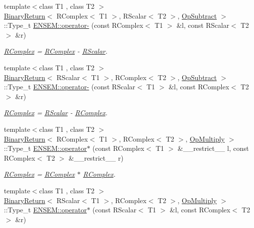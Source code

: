 \begin{DoxyCompactItemize}
{\footnotesize template$<$class T1 , class T2 $>$ }\\\mbox{\hyperlink{structBinaryReturn}{Binary\+Return}}$<$ R\+Complex$<$ T1 $>$, R\+Scalar$<$ T2 $>$, \mbox{\hyperlink{structOpSubtract}{Op\+Subtract}} $>$\+::Type\+\_\+t \mbox{\hyperlink{group__rcomplex_ga9ea00fde5e26657fc53ca42c40fa6618}{E\+N\+S\+E\+M\+::operator-\/}} (const R\+Complex$<$ T1 $>$ \&l, const R\+Scalar$<$ T2 $>$ \&r)
\begin{DoxyCompactList}\small\item\em \mbox{\hyperlink{classENSEM_1_1RComplex}{R\+Complex}} = \mbox{\hyperlink{classENSEM_1_1RComplex}{R\+Complex}} -\/ \mbox{\hyperlink{classENSEM_1_1RScalar}{R\+Scalar}}. \end{DoxyCompactList}\item 
{\footnotesize template$<$class T1 , class T2 $>$ }\\\mbox{\hyperlink{structBinaryReturn}{Binary\+Return}}$<$ R\+Scalar$<$ T1 $>$, R\+Complex$<$ T2 $>$, \mbox{\hyperlink{structOpSubtract}{Op\+Subtract}} $>$\+::Type\+\_\+t \mbox{\hyperlink{group__rcomplex_ga92f922f58ca43c5692f794ecb95dc1f5}{E\+N\+S\+E\+M\+::operator-\/}} (const R\+Scalar$<$ T1 $>$ \&l, const R\+Complex$<$ T2 $>$ \&r)
\begin{DoxyCompactList}\small\item\em \mbox{\hyperlink{classENSEM_1_1RComplex}{R\+Complex}} = \mbox{\hyperlink{classENSEM_1_1RScalar}{R\+Scalar}} -\/ \mbox{\hyperlink{classENSEM_1_1RComplex}{R\+Complex}}. \end{DoxyCompactList}\item 
{\footnotesize template$<$class T1 , class T2 $>$ }\\\mbox{\hyperlink{structBinaryReturn}{Binary\+Return}}$<$ R\+Complex$<$ T1 $>$, R\+Complex$<$ T2 $>$, \mbox{\hyperlink{structOpMultiply}{Op\+Multiply}} $>$\+::Type\+\_\+t \mbox{\hyperlink{group__rcomplex_gab6d38d52433e94dc9aedbb69f2463255}{E\+N\+S\+E\+M\+::operator$\ast$}} (const R\+Complex$<$ T1 $>$ \&\+\_\+\+\_\+restrict\+\_\+\+\_\+ l, const R\+Complex$<$ T2 $>$ \&\+\_\+\+\_\+restrict\+\_\+\+\_\+ r)
\begin{DoxyCompactList}\small\item\em \mbox{\hyperlink{classENSEM_1_1RComplex}{R\+Complex}} = \mbox{\hyperlink{classENSEM_1_1RComplex}{R\+Complex}} $\ast$ \mbox{\hyperlink{classENSEM_1_1RComplex}{R\+Complex}}. \end{DoxyCompactList}\item 
{\footnotesize template$<$class T1 , class T2 $>$ }\\\mbox{\hyperlink{structBinaryReturn}{Binary\+Return}}$<$ R\+Scalar$<$ T1 $>$, R\+Complex$<$ T2 $>$, \mbox{\hyperlink{structOpMultiply}{Op\+Multiply}} $>$\+::Type\+\_\+t \mbox{\hyperlink{group__rcomplex_ga0d32e4173e14565f942b2e42ede11659}{E\+N\+S\+E\+M\+::operator$\ast$}} (const R\+Scalar$<$ T1 $>$ \&l, const R\+Complex$<$ T2 $>$ \&r)

\end{DoxyCompactItemize}
